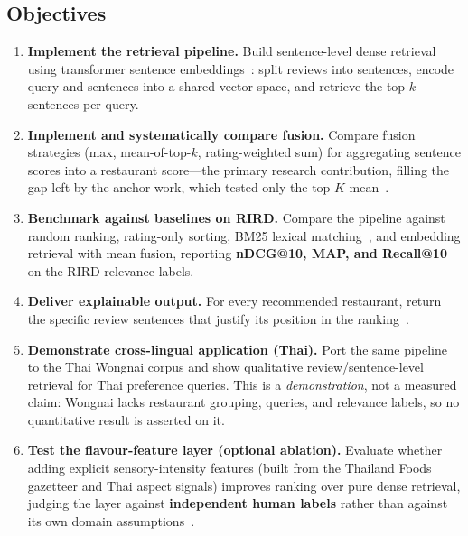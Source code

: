 \subsection{Objectives}
\begin{enumerate}
  \item \textbf{Implement the retrieval pipeline.} Build sentence-level dense retrieval
        using transformer sentence embeddings~\cite{reimers2019sbert,karpukhin2020dpr}:
        split reviews into sentences, encode query and sentences into a shared vector
        space, and retrieve the top-$k$ sentences per query.
  \item \textbf{Implement and systematically compare fusion.} Compare fusion strategies
        (max, mean-of-top-$k$, rating-weighted sum) for aggregating sentence scores into
        a restaurant score---the primary research contribution, filling the gap left by
        the anchor work, which tested only the top-$K$ mean~\cite{rird2023}.
  \item \textbf{Benchmark against baselines on RIRD.} Compare the pipeline against
        random ranking, rating-only sorting, BM25 lexical
        matching~\cite{robertson2009bm25}, and embedding retrieval with mean fusion,
        reporting \textbf{nDCG@10, MAP, and Recall@10} on the RIRD relevance labels.
  \item \textbf{Deliver explainable output.} For every recommended restaurant, return the
        specific review sentences that justify its position in the
        ranking~\cite{zhang2020explainable,kostric2024usage}.
  \item \textbf{Demonstrate cross-lingual application (Thai).} Port the same pipeline to
        the Thai Wongnai corpus and show qualitative review/sentence-level retrieval for
        Thai preference queries. This is a \emph{demonstration}, not a measured claim:
        Wongnai lacks restaurant grouping, queries, and relevance labels, so no
        quantitative result is asserted on it.
  \item \textbf{Test the flavour-feature layer (optional ablation).} Evaluate whether
        adding explicit sensory-intensity features (built from the Thailand Foods
        gazetteer and Thai aspect signals) improves ranking over pure dense retrieval,
        judging the layer against \textbf{independent human labels} rather than against
        its own domain assumptions~\cite{pontiki2014semeval}.
\end{enumerate}

